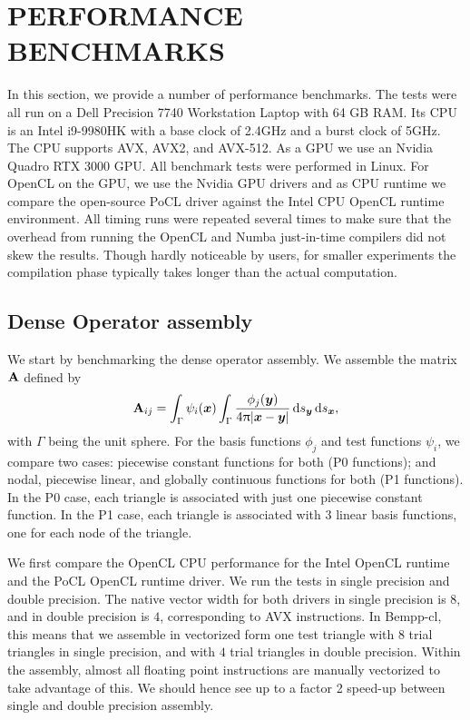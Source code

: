\section{PERFORMANCE BENCHMARKS}

In this section, we provide a number of performance benchmarks. The tests were all run on a Dell Precision 7740 Workstation Laptop with 64 GB RAM. Its CPU is an Intel i9-9980HK with a base clock of 2.4GHz and a burst clock of 5GHz. The CPU supports AVX, AVX2, and AVX-512.
As a GPU we use an Nvidia Quadro RTX 3000 GPU. All benchmark tests were performed in Linux. For OpenCL on the GPU, we use the Nvidia GPU drivers and as CPU runtime we compare the open-source PoCL driver against the Intel CPU OpenCL runtime environment. All timing runs were repeated several times to make sure that the overhead from running the OpenCL and Numba just-in-time compilers did not skew the results. Though hardly noticeable by users, for smaller experiments the compilation phase typically takes longer than the actual computation.

\subsection{Dense Operator assembly}
We start by benchmarking the dense operator assembly. We assemble the matrix $\mathbf{A}$ defined by
$$
\dmat{A}_{ij} = \int_{\Gamma}\psi_i(\bx)\int_{\Gamma}\frac{\phi_j(\by)}{4\uppi |\bx -\by|}\ds[\by]\ds[\bx],
$$
with $\Gamma$ being the unit sphere. For the basis functions $\phi_j$ and test functions $\psi_i$, we compare two cases: piecewise constant functions for both (P0 functions); and nodal, piecewise linear, and globally continuous functions for both (P1 functions). In the P0 case, each triangle is associated with just one piecewise constant function. In the P1 case, each triangle is associated with $3$ linear basis functions, one for each node of the triangle.

We first compare the OpenCL CPU performance for the Intel OpenCL runtime and the PoCL OpenCL runtime driver. We run the tests in single precision and double precision. The native vector width for both drivers in single precision is $8$, and in double precision is $4$, corresponding to AVX instructions. In Bempp-cl, this means that we assemble in vectorized form one test triangle with $8$ trial triangles in single precision, and with $4$ trial triangles in double precision. Within the assembly, almost all floating point instructions are manually vectorized to take advantage of this. We should hence see up to a factor 2 speed-up between single and double precision assembly.

